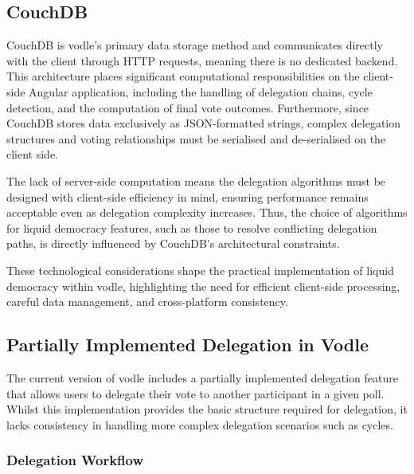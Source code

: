\subsection*{CouchDB}
CouchDB \citep{couchdb} is vodle's primary data storage method and communicates directly with the client through HTTP requests, meaning there is no dedicated backend. This architecture places significant computational responsibilities on the client-side Angular application, including the handling of delegation chains, cycle detection, and the computation of final vote outcomes. Furthermore, since CouchDB stores data exclusively as JSON-formatted strings, complex delegation structures and voting relationships must be serialised and de-serialised on the client side.

The lack of server-side computation means the delegation algorithms must be designed with client-side efficiency in mind, ensuring performance remains acceptable even as delegation complexity increases. Thus, the choice of algorithms for liquid democracy features, such as those to resolve conflicting delegation paths, is directly influenced by CouchDB's architectural constraints.

These technological considerations shape the practical implementation of liquid democracy within vodle, highlighting the need for efficient client-side processing, careful data management, and cross-platform consistency.

\subsection{Partially Implemented Delegation in Vodle}

The current version of vodle includes a partially implemented delegation feature that allows users to delegate their vote to another participant in a given poll. Whilst this implementation provides the basic structure required for delegation, it lacks consistency in handling more complex delegation scenarios such as cycles.

\subsubsection*{Delegation Workflow}

